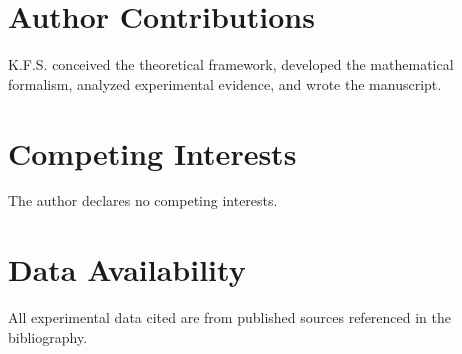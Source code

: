 \documentclass[11pt,a4paper]{article}
\begin{document}
\section*{Author Contributions}
K.F.S. conceived the theoretical framework, developed the mathematical formalism, analyzed experimental evidence, and wrote the manuscript.

\section*{Competing Interests}
The author declares no competing interests.

\section*{Data Availability}
All experimental data cited are from published sources referenced in the bibliography.
\end{document}
